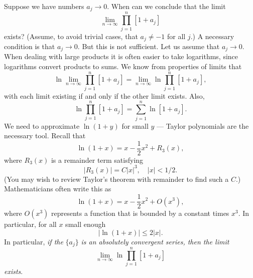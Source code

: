 \documentclass{stml-l}
\theoremstyle{definition}
\numberwithin{equation}{chapter}
\numberwithin{figure}{chapter}
\numberwithin{figure}{section}
\begin{document}
Suppose we have numbers $a_{j}\rightarrow 0$. When can we conclude
that the limit
\begin{equation*}
\lim_{n\rightarrow\infty}\prod\limits_{j=1}^{n}[1+a_{j}]
\end{equation*}
exists? (Assume, to avoid trivial cases, that $a_{j}\neq-1$ for all
$j$.) A necessary condition is that $a_{j}\rightarrow 0$. But this
is not sufficient. Let us assume that $a_{j}\rightarrow 0$. When
dealing with large products it is often easier to take logarithms,
since logarithms convert products to sums. We know from properties
of limits that
\begin{equation*}
\ln\lim_{n\rightarrow\infty}\prod\limits_{j=1}^{n}[1+a_{j}]=\lim_{n\rightarrow\infty}\ln\prod\limits_{j=1}^{n}[1+a_{j}],
\end{equation*}
with each limit existing if and only if the other limit exists. Also,
\begin{equation*}
\ln\prod\limits_{j=1}^{n}[1+a_{j}]=\sum\limits_{j=1}^{n}\ln[1+a_{j}].
\end{equation*}
We need to approximate $\ln(1+y)$ for small $y$ --- Taylor
polynomials are the necessary tool. Recall that
\begin{equation*}
\ln(1+x)=x-\frac{1}{2}x^{2}+R_{3}(x),
\end{equation*}
where $R_{3}(x)$ is a remainder term satisfying
\begin{equation*}
|R_{3}(x)|=C|x|^{3},\quad |x|<1/2.
\end{equation*}
(You may wish to review Taylor's theorem with remainder to find such
a $C$.) Mathematicians often write this as
\begin{equation*}
\ln(1+x)=x-\frac{1}{2}x^{2}+O(x^{3}),
\end{equation*}
where $O(x^{3})$ represents a function that is bounded by a constant
times $x^{3}$. In particular, for all $x$ small enough
\begin{equation*}
|\ln(1+x)|\leq 2|x|.
\end{equation*}
In particular, \emph{if the} $\{a_{j}\}$ \emph{is an absolutely convergent series, then the limit}
\begin{equation*}
\lim_{n\rightarrow\infty}\ln\prod\limits_{j=1}^{n}[1+a_{j}]
\end{equation*}
\emph{exists}.
\end{document}

